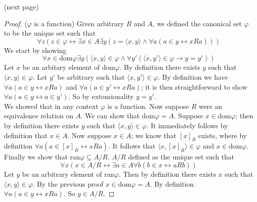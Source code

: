 \documentclass{report}
\begin{document}
(next page)\newpage
\begin{proof} ($\varphi$ is a function)
Given arbitrary $R$ and $A$, we defined the canonical set $\varphi$ to be the unique set such that
\begin{equation*}
\forall z(z\in\varphi\leftrightarrow\exists x\in A\exists y(z=\langle x,y\rangle\land\forall a(a\in y\leftrightarrow xRa)))
\end{equation*}
We start by showing
\begin{equation*}
\forall x\in\text{dom}\varphi\exists y(\langle x,y\rangle\in\varphi\land\forall y'(\langle x,y'\rangle\in\varphi\to y=y'))
\end{equation*}
Let $x$ be an arbitary element of dom$\varphi$. By definition there exists $y$ such that
$\langle x,y\rangle\in\varphi$. Let $y'$ be arbitrary such that $\langle x,y'\rangle\in\varphi$.
By definition we have $\forall a(a\in y\leftrightarrow xRa)$ and $\forall a(a\in y'\leftrightarrow xRa)$; it is then straightforward to show $\forall a(a\in y\leftrightarrow a\in y')$. 
So by extensionality $y=y'$.\\
\indent We showed that in any context $\varphi$ is a function. Now suppose $R$ were an equivalence relation on $A$. We can show that dom$\varphi=A$. Suppose $x\in\text{dom}\varphi$; then by
definition there exists $y$ such that $\langle x,y\rangle\in\varphi$. It immediately follows by definition that $x\in A$. Now suppose $x\in A$; we know that $[x]_R$ exists, where by definition
$\forall a(a\in[x]_R\leftrightarrow xRa)$. It follows that $\langle x,[x]_R\rangle\in\varphi$ and $x\in\text{dom}\varphi$.\\
\indent Finally we show that ran$\varphi\subseteq A/R$. $A/R$ defined as the unique set such that
\begin{equation*}
\forall x(x\in A/R\leftrightarrow\exists a\in A\forall b(b\in x\leftrightarrow aRb))
\end{equation*}
Let $y$ be an arbitrary element of ran$\varphi$. Then by definition there exists $x$ such that $\langle x,y\rangle\in\varphi$. By the previous proof $x\in\text{dom}\varphi=A$.
By definition $\forall a(a\in y\leftrightarrow xRa)$. So $y\in A/R$.
\end{proof}
\newpage
\end{document}
